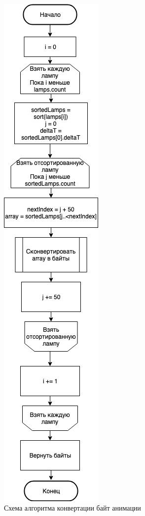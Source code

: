 \newpage
~
\begin{figure}[H]
\centering
	\includegraphics[scale=0.5]{figures/bytesSending.png}
	\caption{Схема алгоритма конвертации байт анимации}
	\label{fig:appendices:algorithms:bytesSending}
\end{figure}
